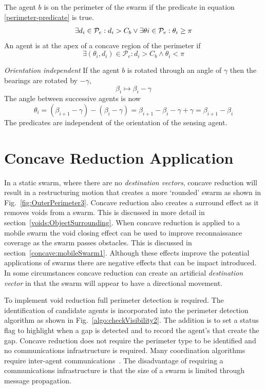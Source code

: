 \documentclass{ieeeaccess}
\begin{document}
The agent $b$ is on the perimeter of the swarm if the predicate in equation
\ref{perimeter-predicate} is true.
\begin{equation}
	\exists d_i\in\mathcal{P}_e:d_i>C_b \vee
	\exists\theta\-i\in\mathcal{P}_e:\theta_i\geq\pi
	\label{perimeter-predicate}
\end{equation}
An agent is at the apex of a concave region of the perimeter if
\begin{equation}
	\exists(\theta_i,d_i)\in\mathcal{P}_e : d_i>C_b\wedge\theta_i<\pi
	\label{concave-predicate}
\end{equation}


\textit{Orientation independent}  If the agent $b$ is rotated through an angle of $\gamma$ then 
the bearings are rotated by $-\gamma$, \[ \beta_i\mapsto\beta_i-\gamma \]
The  angle between successive agents is now
\[
	\theta_i  =  (\beta_{i+1}-\gamma) - (\beta_i-\gamma)
	 = \beta_{i+1}-\beta_i-\gamma+\gamma
	 = \beta_{i+1}-\beta_i
\]
The predicates are independent of the orientation of the sensing agent.

\section{Concave Reduction Application}\label{sec:ConcaveReductionApplication}
In a static swarm, where there are no \textit{destination vectors}, concave reduction will result in a restructuring motion that creates a more `rounded' swarm as shown in Fig.~\ref{fig:OuterPerimeter3}. Concave reduction also creates a surround effect as it removes voids from a swarm. This is discussed in more detail in section~\ref{voids:ObjectSurrounding}. When concave reduction is applied to a mobile swarm the void closing effect can be used to improve reconnaissance coverage as the swarm passes obstacles. This is discussed in section~\ref{concave:mobileSwarm1}.
Although these effects improve the potential applications of swarms there are negative effects that can be impact introduced. In some circumstances concave reduction can create an artificial \textit{destination vector} in that the swarm will appear to have a directional movement. 

To implement void reduction full perimeter detection is required. The identification of candidate agents is incorporated into the perimeter detection algorithm as shown in Fig.~\ref{algo:checkVisibility2}. The addition is to set a status flag to highlight when a gap is detected and to record the agent's that create the gap. Concave reduction does not require the perimeter type to be identified and no communications infrastructure is required. Many coordination algorithms require inter-agent communications~\cite{MD:09,NIM:09,SOM:12,ZFG:13,JG:13}. The disadvantage of requiring a communications infrastructure is that the size of a swarm is limited through message propagation.
\end{document}
